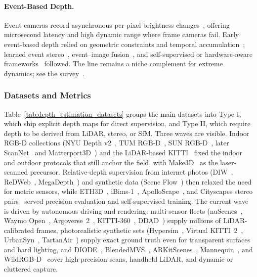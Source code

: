 \paragraph{Event-Based Depth.}
Event cameras record asynchronous per-pixel brightness changes~\cite{mahowald1992vlsi, lichtsteiner2008128}, offering microsecond latency and high dynamic range where frame cameras fail. Early event-based depth relied on geometric constraints and temporal accumulation~\cite{rebecq2018emvs, ieng2018neuromorphic,zhou2018semi, xie2017event}; learned event stereo~\cite{tulyakov2019learning, zhang2022discrete}, event--image fusion~\cite{mostafavi2021event, ghosh2022multi}, and self-supervised or hardware-aware frameworks~\cite{cho2023learning, de2025derd, cho2024temporal} followed. The line remains a niche complement for extreme dynamics; see the survey~\cite{ghosh2025event}.

\subsubsection{Datasets and Metrics}
Table~\ref{tab:depth_estimation_datasets} groups the main datasets into Type I, which ship explicit depth maps for direct supervision, and Type II, which require depth to be derived from LiDAR, stereo, or SfM. Three waves are visible. Indoor RGB-D collections (NYU Depth v2~\cite{silberman2012nyudv2}, TUM RGB-D~\cite{Sturm2012TUMRGBD}, SUN RGB-D~\cite{song2015sunrgbd}, later ScanNet~\cite{dai2017scannet} and Matterport3D~\cite{chang2017matterport3d}) and the LiDAR-based KITTI~\cite{Geiger2013KITTI,uhrig2017sparsity} fixed the indoor and outdoor protocols that still anchor the field, with Make3D~\cite{saxena2008make3d} as the laser-scanned precursor. Relative-depth supervision from internet photos (DIW~\cite{chen2016single}, ReDWeb~\cite{xian2018monocular}, MegaDepth~\cite{li2018megadepth}) and synthetic data (Scene Flow~\cite{mayer2016large}) then relaxed the need for metric sensors, while ETH3D~\cite{Schoeps2017ETH3D}, iBims-1~\cite{koch2018evaluation}, ApolloScape~\cite{wang2019apolloscape}, and Cityscapes stereo pairs~\cite{cordts2016cityscapes} served precision evaluation and self-supervised training. The current wave is driven by autonomous driving and rendering: multi-sensor fleets (nuScenes~\cite{caesar2020nuscenes}, Waymo Open~\cite{WaymoOpen-SunKDCPTGZCCVHN20}, Argoverse~2~\cite{wilson2023argoverse}, KITTI-360~\cite{liao2022kitti360}, DDAD~\cite{guizilini20203d}) supply millions of LiDAR-calibrated frames, photorealistic synthetic sets (Hypersim~\cite{roberts2021hypersim}, Virtual KITTI~2~\cite{Cabon2020VirtualKITTI2}, UrbanSyn~\cite{UrbanSyn}, TartanAir~\cite{TartanAir}) supply exact ground truth even for transparent surfaces and hard lighting, and DIODE~\cite{vasiljevic2019diode}, BlendedMVS~\cite{yao2020blendedmvs}, ARKitScenes~\cite{baruch2021arkitscenes}, Mannequin~\cite{li2019learning}, and WildRGB-D~\cite{xia2024rgbd} cover high-precision scans, handheld LiDAR, and dynamic or cluttered capture.

